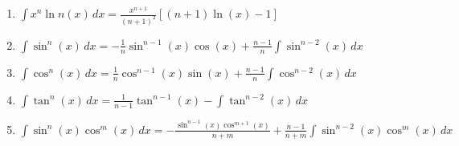 \documentclass[11pt]{article}
\begin{document}
\begin{enumerate}
\item $\displaystyle \int x^n \ln{n}(x)\,dx = \frac{x^{n+1}}{(n+1)^2}[(n+1)\ln(x)-1]$
\item $\displaystyle \int \sin^{n}(x)\,dx = -\frac{1}{n}\sin^{n-1}(x)\cos(x)
+\frac{n-1}{n}\int \sin^{n-2}(x)\,dx$
\item $\displaystyle \int \cos^{n}(x)\,dx = \frac{1}{n}\cos^{n-1}(x)\sin(x)
+\frac{n-1}{n}\int \cos^{n-2}(x)\,dx$
\item $\displaystyle \int \tan^{n}(x)\,dx = \frac{1}{n-1}\tan^{n-1}(x)- 
\int \tan^{n-2}(x)\,dx$
\item $\displaystyle \int \sin^{n}(x)\cos^{m}(x)\,dx = -\frac{\sin^{n-1}(x)\cos^{m+1}(x)}{n+m}+\frac{n-1}{n+m}\int \sin^{n-2}(x)\cos^{m}(x)\,dx$
\end{enumerate}
\end{document}
